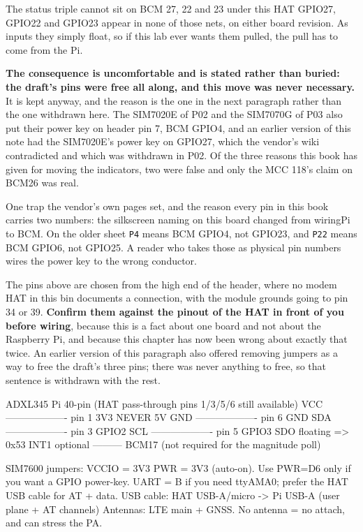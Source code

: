 \begin{note}{The status triple cannot sit on BCM 27, 22 and 23 under this HAT}
GPIO27, GPIO22 and GPIO23 appear in none of those nets, on either board revision. As inputs they simply float, so if this lab ever wants them pulled, the pull has to come from the Pi.

\textbf{The consequence is uncomfortable and is stated rather than buried: the draft's pins were free all along, and this move was never necessary.} It is kept anyway, and the reason is the one in the next paragraph rather than the one withdrawn here. The SIM7020E of P02 and the SIM7070G of P03 also put their power key on header pin 7, BCM GPIO4, and an earlier version of this note had the SIM7020E's power key on GPIO27, which the vendor's wiki contradicted and which was withdrawn in P02. Of the three reasons this book has given for moving the indicators, two were false and only the MCC 118's claim on BCM26 was real.

One trap the vendor's own pages set, and the reason every pin in this book carries two numbers: the silkscreen naming on this board changed from wiringPi to BCM. On the older sheet \texttt{P4} means BCM GPIO4, not GPIO23, and \texttt{P22} means BCM GPIO6, not GPIO25. A reader who takes those as physical pin numbers wires the power key to the wrong conductor.

The pins above are chosen from the high end of the header, where no modem HAT in this bin documents a connection, with the module grounds going to pin 34 or 39. \textbf{Confirm them against the pinout of the HAT in front of you before wiring}, because this is a fact about one board and not about the Raspberry Pi, and because this chapter has now been wrong about exactly that twice. An earlier version of this paragraph also offered removing jumpers as a way to free the draft's three pins; there was never anything to free, so that sentence is withdrawn with the rest.
\end{note}

\begin{asciiart}
ADXL345                 Pi 40-pin (HAT pass-through pins 1/3/5/6 still available)
VCC ------------------- pin 1  3V3      NEVER 5V
GND ------------------- pin 6  GND
SDA ------------------- pin 3  GPIO2
SCL ------------------- pin 5  GPIO3
SDO floating => 0x53
INT1 optional --------- BCM17  (not required for the magnitude poll)

SIM7600 jumpers:
  VCCIO = 3V3
  PWR   = 3V3   (auto-on). Use PWR=D6 only if you want a GPIO power-key.
  UART  = B if you need ttyAMA0; prefer the HAT USB cable for AT + data.
USB cable: HAT USB-A/micro -> Pi USB-A  (user plane + AT channels)
Antennas: LTE main + GNSS. No antenna = no attach, and can stress the PA.
\end{asciiart}

